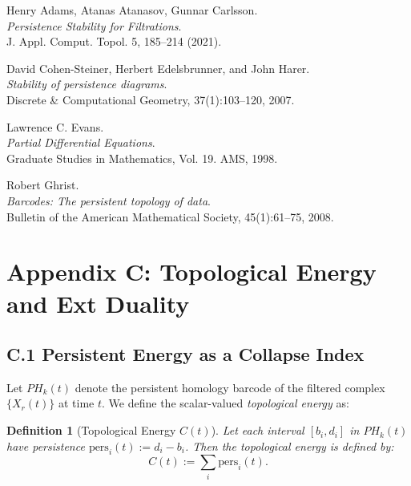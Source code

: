\documentclass[11pt]{article}
\newtheorem{definition}[theorem]{Definition}
\begin{document}
\begin{thebibliography}{9}

Henry Adams, Atanas Atanasov, Gunnar Carlsson.\\
\textit{Persistence Stability for Filtrations}.\\
J. Appl. Comput. Topol. 5, 185–214 (2021).

David Cohen-Steiner, Herbert Edelsbrunner, and John Harer.\\
\textit{Stability of persistence diagrams}.\\
Discrete \& Computational Geometry, 37(1):103--120, 2007.

Lawrence C. Evans.\\
\textit{Partial Differential Equations}.\\
Graduate Studies in Mathematics, Vol. 19. AMS, 1998.

Robert Ghrist.\\
\textit{Barcodes: The persistent topology of data}.\\
Bulletin of the American Mathematical Society, 45(1):61--75, 2008.

\end{thebibliography}




\section*{Appendix C: Topological Energy and Ext Duality}

\subsection*{C.1 Persistent Energy as a Collapse Index}

Let $PH_k(t)$ denote the persistent homology barcode of the filtered complex $\{X_r(t)\}$ at time $t$.  
We define the scalar-valued \emph{topological energy} as:

\begin{definition}[Topological Energy $C(t)$]
Let each interval $[b_i, d_i]$ in $PH_k(t)$ have persistence $\text{pers}_i(t) := d_i - b_i$.  
Then the topological energy is defined by:
\[
C(t) := \sum_i \text{pers}_i(t).
\]
\end{definition}
\end{document}

